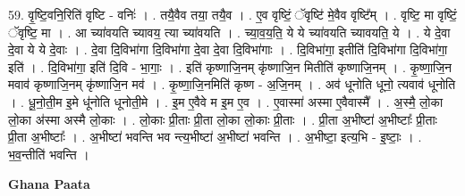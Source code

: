 \documentclass[17pt]{extarticle}
\begin{document}
59. वृ॒ष्टि॒वनि॒रिति॑ वृष्टि - वनिः॑ । . तयै॒वैव तया॒ तयै॒व । . ए॒व वृष्टिं॒ ॅवृष्टि॑ मे॒वैव वृष्टि᳚म् । . वृष्टि॒ मा वृष्टिं॒ ॅवृष्टि॒ मा । . आ च्या॑वयति च्यावय॒ त्या च्या॑वयति । . च्या॒व॒य॒ति॒ ये ये च्या॑वयति च्यावयति॒ ये । . ये दे॒वा दे॒वा ये ये दे॒वाः । . दे॒वा दि॒विभा॑गा दि॒विभा॑गा दे॒वा दे॒वा दि॒विभा॑गाः । . दि॒विभा॑गा॒ इतीति॑ दि॒विभा॑गा दि॒विभा॑गा॒ इति॑ । . दि॒विभा॑गा॒ इति॑ दि॒वि - भा॒गाः॒ । . इति॑ कृष्णाजि॒नम् कृ॑ष्णाजि॒न मितीति॑ कृष्णाजि॒नम् । . कृ॒ष्णा॒जि॒न मवाव॑ कृष्णाजि॒नम् कृ॑ष्णाजि॒न मव॑ । . कृ॒ष्णा॒जि॒नमिति॑ कृष्ण - अ॒जि॒नम् । . अव॑ धूनोति धूनो॒ त्यवाव॑ धूनोति । . धू॒नो॒ती॒म इ॒मे धू॑नोति धूनोती॒मे । . इ॒म ए॒वैवे म इ॒म ए॒व । . ए॒वास्मा॑ अस्मा ए॒वैवास्मै᳚ । . अ॒स्मै॒ लो॒का लो॒का अ॑स्मा अस्मै लो॒काः । . लो॒काः प्री॒ताः प्री॒ता लो॒का लो॒काः प्री॒ताः । . प्री॒ता अ॒भीष्टा॑ अ॒भीष्टाः᳚ प्री॒ताः प्री॒ता अ॒भीष्टाः᳚ । . अ॒भीष्टा॑ भवन्ति भव न्त्य॒भीष्टा॑ अ॒भीष्टा॑ भवन्ति । . अ॒भीष्टा॒ इत्य॒भि - इ॒ष्टाः॒ । . भ॒व॒न्तीति॑ भवन्ति । \newline

\textbf{Ghana Paata } \newline
\end{document}
